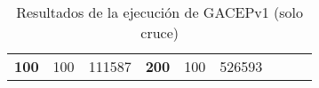 \begin{table}[]
\begin{tabular}{|ccrccrccc}
\multicolumn{1}{|c|}{\multirow{-39}{*}{\cellcolor[HTML]{FFFFC7}\textbf{100}}} & \multicolumn{1}{c|}{\multirow{-9}{*}{\cellcolor[HTML]{DDFDFF}100}} & \multicolumn{1}{r|}{\cellcolor[HTML]{DAE8FC}111587}    & \multicolumn{1}{c|}{\multirow{-39}{*}{\cellcolor[HTML]{FFFFC7}\textbf{200}}} & \multicolumn{1}{c|}{\multirow{-10}{*}{\cellcolor[HTML]{DDFDFF}100}} & \multicolumn{1}{r|}{\cellcolor[HTML]{DDFDFF}526593}    &                                                                              &                                                                    &                                                        \\ \cline{1-6}
\end{tabular}
\caption{\label{HistCruce}Resultados de la ejecución de GACEPv1 (solo cruce)}
\end{table}

